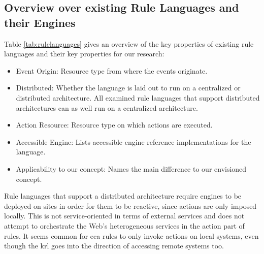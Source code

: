 \subsection{Overview over existing Rule Languages and their Engines}
Table \ref{tab:rulelanguages} gives an overview of the key properties of existing rule languages and their key properties for our research:
\begin{itemize}
  \item \textrm{Event Origin}: Resource type from where the events originate.
  \item \textrm{Distributed}: Whether the language is laid out to run on a centralized or distributed architecture. All examined rule languages that support distributed architectures can as well run on a centralized architecture.
  \item \textrm{Action Resource}: Resource type on which actions are executed.
  \item \textrm{Accessible Engine}: Lists accessible engine reference implementations for the language.
  \item \textrm{Applicability to our concept}: Names the main difference to our envisioned concept.
\end{itemize}
Rule languages that support a distributed architecture require engines to be deployed on sites in order for them to be reactive, since actions are only imposed locally.
This is not service-oriented in terms of external services and does not attempt to orchestrate the Web's heterogeneous services in the action part of rules.
It seems common for \textrm{\acrshort{eca}} rules to only invoke actions on local systems, even though the \textrm{\acrshort{krl}} goes into the direction of accessing remote systems too.

